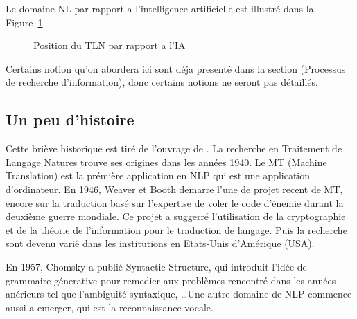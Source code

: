 Le domaine NL par rapport a l'intelligence artificielle est illustré dans la Figure~\ref{fig:nlp-ref-ai}.

\begin{figure}[htbp]
    \begin{center}
    \end{center}
    \caption{Position du TLN par rapport a l'IA \citep{devopedia-nlp}}
    \label{fig:nlp-ref-ai}
\end{figure}

Certains notion qu'on abordera ici sont déja presenté dans la section (Processus de recherche d'information), donc certains notions ne seront pas détaillés.

\subsection{Un peu d'histoire}
Cette briève historique est tiré de l'ouvrage de \citeauthor{natural-language-processing} \citep{natural-language-processing}. La recherche en Traitement de Langage Natures trouve ses origines dans les années 1940. Le MT (Machine Translation) est la prémière application en NLP qui est une application d'ordinateur. En 1946, Weaver et Booth demarre l'une de projet recent de MT, encore sur la traduction basé sur l'expertise de voler le code d'énemie durant la deuxième guerre mondiale. Ce projet a suggerré l'utilisation de la cryptographie et de la théorie de l'information pour le traduction de langage. Puis la recherche sont devenu varié dans les institutions en Etats-Unis d'Amérique (USA).

En 1957, Chomsky a publié Syntactic Structure, qui introduit l'idée de grammaire génerative pour remedier aux problèmes rencontré dans les années anérieurs tel que l'ambiguité syntaxique, \dots Une autre domaine de NLP commence aussi a emerger, qui est la reconnaissance vocale.

